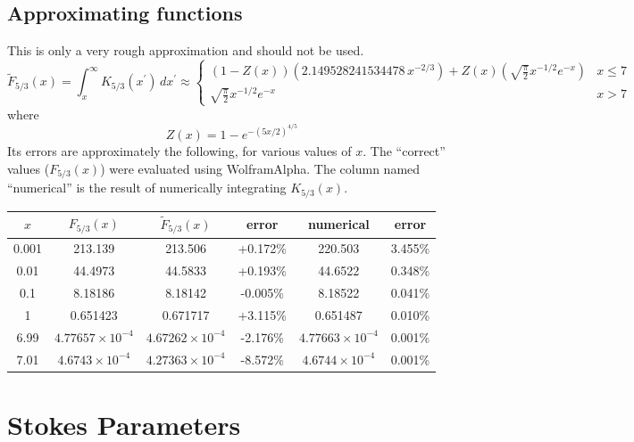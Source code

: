 \documentclass{book}
\begin{document}
\subsection{Approximating functions}

This is only a very rough approximation and should not be used.
\begin{equation}
    \tilde{F}_{5/3}(x) = \int_x^\infty K_{5/3}(x^\prime)\,dx^\prime
        \approx \begin{cases}
            (1-Z(x))(2.149528241534478\,x^{-2/3}) + Z(x)\left(\sqrt{\frac{\pi}{2}}x^{-1/2}e^{-x}\right) & x \le 7 \\
            \sqrt{\frac{\pi}{2}}x^{-1/2}e^{-x} & x > 7
        \end{cases}
\end{equation}
where
\begin{equation}
    Z(x) = 1-e^{-(5x/2)^{4/5}}
\end{equation}
Its errors are approximately the following, for various values of $x$.
The ``correct'' values ($F_{5/3}(x)$) were evaluated using WolframAlpha.
The column named ``numerical'' is the result of numerically integrating $K_{5/3}(x)$.
\begin{table}[!ht]
    \centering
    \begin{tabular}{c|c|c|c|c|c}
        $x$ & $F_{5/3}(x)$ & $\tilde{F}_{5/3}(x)$ & error & numerical & error \\
        \hline
        0.001 & 213.139                & 213.506                & +0.172\% & 220.503                & 3.455\% \\
        0.01  & 44.4973                & 44.5833                & +0.193\% & 44.6522                & 0.348\% \\
        0.1   & 8.18186                & 8.18142                & -0.005\% & 8.18522                & 0.041\% \\
        1     & 0.651423               & 0.671717               & +3.115\% & 0.651487               & 0.010\% \\
        6.99  & $4.77657\times10^{-4}$ & $4.67262\times10^{-4}$ & -2.176\% & $4.77663\times10^{-4}$ & 0.001\% \\
        7.01  & $4.6743\times10^{-4}$  & $4.27363\times10^{-4}$ & -8.572\% & $4.6744\times10^{-4}$  & 0.001\%
    \end{tabular}
\end{table}

\section{Stokes Parameters}
\end{document}
